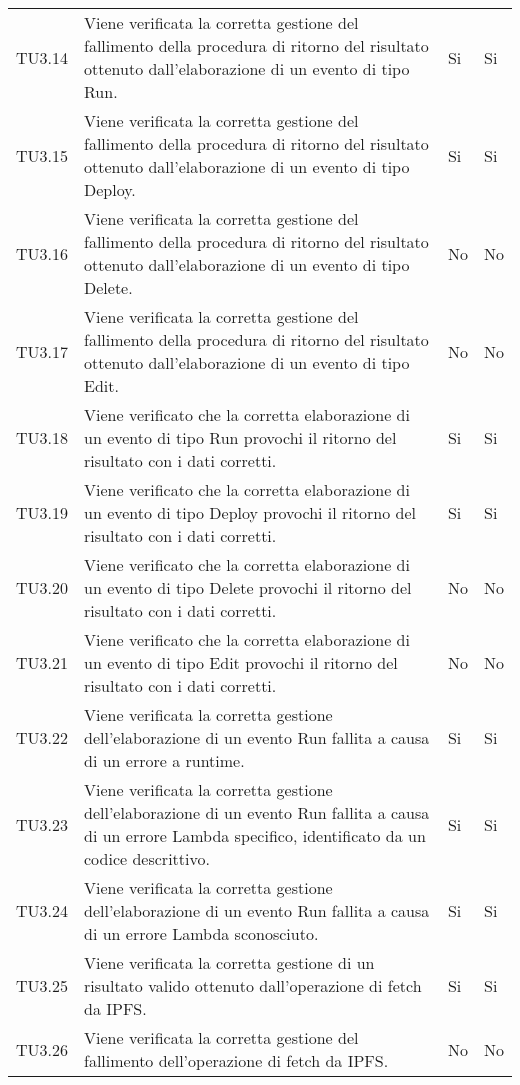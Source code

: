 \begin{longtable}{
		>{\centering}p{}
		>{}p{}
		>{\centering}p{}
		>{\centering}p{} }
TU3.14 & Viene verificata la corretta gestione del fallimento della procedura di ritorno del risultato ottenuto dall'elaborazione di un evento di tipo Run.  & Si & Si \tabularnewline

TU3.15 & Viene verificata la corretta gestione del fallimento della procedura di ritorno del risultato ottenuto dall'elaborazione di un evento di tipo Deploy.  & Si & Si \tabularnewline

TU3.16 & Viene verificata la corretta gestione del fallimento della procedura di ritorno del risultato ottenuto dall'elaborazione di un evento di tipo Delete.  & No & No \tabularnewline

TU3.17 & Viene verificata la corretta gestione del fallimento della procedura di ritorno del risultato ottenuto dall'elaborazione di un evento di tipo Edit.  & No & No \tabularnewline

TU3.18 & Viene verificato che la corretta elaborazione di un evento di tipo Run provochi il ritorno del risultato con i dati corretti. & Si & Si \tabularnewline

TU3.19 & Viene verificato che la corretta elaborazione di un evento di tipo Deploy provochi il ritorno del risultato con i dati corretti. & Si & Si \tabularnewline

TU3.20 & Viene verificato che la corretta elaborazione di un evento di tipo Delete provochi il ritorno del risultato con i dati corretti. & No & No \tabularnewline

TU3.21 & Viene verificato che la corretta elaborazione di un evento di tipo Edit provochi il ritorno del risultato con i dati corretti. & No & No \tabularnewline

TU3.22 & Viene verificata la corretta gestione dell'elaborazione di un evento Run fallita a causa di un errore a runtime. & Si & Si \tabularnewline

TU3.23 & Viene verificata la corretta gestione dell'elaborazione di un evento Run fallita a causa di un errore Lambda specifico, identificato da un codice descrittivo. & Si & Si \tabularnewline

TU3.24 & Viene verificata la corretta gestione dell'elaborazione di un evento Run fallita a causa di un errore Lambda sconosciuto. & Si & Si \tabularnewline

TU3.25 & Viene verificata la corretta gestione di un risultato valido ottenuto dall'operazione di fetch da IPFS. & Si & Si \tabularnewline

TU3.26 & Viene verificata la corretta gestione del fallimento dell'operazione di fetch da IPFS. & No & No \tabularnewline


\end{longtable}
